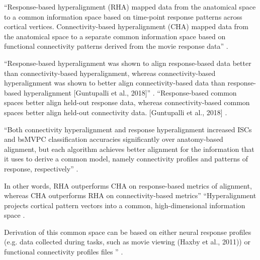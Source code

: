 



%
``Response-based hyperalignment (RHA) mapped data from the anatomical space to a
common information space based on time-point response patterns across cortical
vertices.
%
Connectivity-based hyperalignment (CHA) mapped data from the
anatomical space to a separate common information space based on functional
connectivity patterns derived from the movie response data''
\citep{busch2021hybrid}.

``Response-based hyperalignment was shown to align response-based data better
than connectivity-based hyperalignment, whereas connectivity-based
hyperalignment was shown to better align connectivity-based data than
response-based hyperalignment [Guntupalli et al., 2018]''
\citep{busch2021hybrid}.
%
``Response-based common spaces better align held-out response data, whereas
connectivity-based common spaces better align held-out connectivity data.
[Guntupalli et al., 2018] \citep{busch2021hybrid}.

%
``Both connectivity hyperalignment and response hyperalignment increased ISCs
and bsMVPC classification accuracies significantly over anatomy-based alignment,
but each algorithm achieves better alignment for the information that it uses to
derive a common model, namely connectivity profiles and patterns of response,
respectively'' \citep{guntupalli2018computational}.


%
In other words, RHA outperforms CHA on response-based metrics of alignment,
whereas CHA outperforms RHA on connectivity-based metrics'' ``Hyperalignment
projects cortical pattern vectors into a common, high-dimensional information
space \citep{haxby2020hyperalignment}.

%
Derivation of this common space can be based on either neural response profiles
(e.g. data collected during tasks, such as movie viewing (Haxby et al., 2011))
or functional connectivity profiles files \citep{guntupalli2018computational}''
\citep{busch2021hybrid}.

